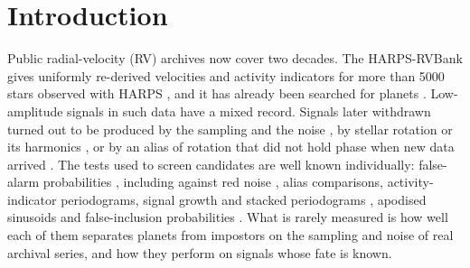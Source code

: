 \section{Introduction}
\label{sec:intro}

Public radial-velocity (RV) archives now cover two decades. The HARPS-RVBank
\citep{Trifonov2020,Perdelwitz2024} gives uniformly re-derived velocities and
activity indicators for more than 5000 stars observed with HARPS
\citep{Mayor2003}, and it has already been searched for planets
\citep{Sreenivas2022}. Low-amplitude signals in such data have a mixed record.
Signals later withdrawn turned out to be produced by the sampling and the noise
\citep{Rajpaul2016}, by stellar rotation or its harmonics
\citep{Robertson2014,Santos2014,Robertson2015,Carleo2020,Burrows2024}, or by an alias
of rotation that did not hold phase when new data arrived \citep{Lubin2021}.
The tests used to screen candidates are well known individually: false-alarm
probabilities \citep{Baluev2008}, including against red noise \citep{Ejaz2026}, alias comparisons, activity-indicator
periodograms, signal growth and stacked periodograms \citep{MortierCC2017},
apodised sinusoids \citep{Hara2022b} and false-inclusion probabilities
\citep{Hara2022}. What is rarely measured is how well each of them separates
planets from impostors on the sampling and noise of real archival series, and
how they perform on signals whose fate is known.

